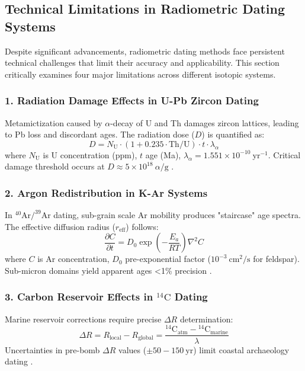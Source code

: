 \documentclass{article}
\begin{document}
\subsection{Technical Limitations in Radiometric Dating Systems}
\label{subsec:challenges}

Despite significant advancements, radiometric dating methods face persistent technical challenges that limit their accuracy and applicability. This section critically examines four major limitations across different isotopic systems.

\subsubsection*{1. Radiation Damage Effects in U-Pb Zircon Dating}
Metamictization caused by \(\alpha\)-decay of U and Th damages zircon lattices, leading to Pb loss and discordant ages. The radiation dose (\(D\)) is quantified as:
\begin{equation}
    D = N_{\text{U}} \cdot (1 + 0.235 \cdot \text{Th/U}) \cdot t \cdot \lambda_{\alpha}
    \label{eq:radiation_dose}
\end{equation}
where \(N_{\text{U}}\) is U concentration (ppm), \(t\) age (Ma), \(\lambda_{\alpha} = 1.551 \times 10^{-10}\ \text{yr}^{-1}\). Critical damage threshold occurs at \(D \approx 5 \times 10^{18}\ \alpha/\text{g}\) \cite{Nasdala2001}.

\subsubsection*{2. Argon Redistribution in K-Ar Systems}
In \(^{40}\text{Ar}/^{39}\text{Ar}\) dating, sub-grain scale Ar mobility produces "staircase" age spectra. The effective diffusion radius (\(r_{\text{eff}}\)) follows:
\begin{equation}
    \frac{\partial C}{\partial t} = D_0 \exp\left(-\frac{E_a}{RT}\right) \nabla^2 C
    \label{eq:arg_diffusion}
\end{equation}
where \(C\) is Ar concentration, \(D_0\) pre-exponential factor (\(10^{-3}\ \text{cm}^2/\text{s}\) for feldspar). Sub-micron domains yield apparent ages <1\% precision \cite{Villa2016}.

\subsubsection*{3. Carbon Reservoir Effects in \(^{14}\text{C}\) Dating}
Marine reservoir corrections require precise \(\Delta R\) determination:
\begin{equation}
    \Delta R = R_{\text{local}} - R_{\text{global}} = \frac{{}^{14}\text{C}_{\text{atm}} - {}^{14}\text{C}_{\text{marine}}}{\lambda}
    \label{eq:delta_r}
\end{equation}
Uncertainties in pre-bomb \(\Delta R\) values (\(\pm 50-150\ \text{yr}\)) limit coastal archaeology dating \cite{Reimer2020}.
\end{document}
